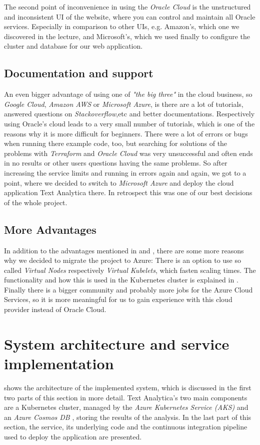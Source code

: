 \documentclass[conference]{IEEEtran}
\begin{document}
The second point of inconvenience in using the \textit{Oracle Cloud} is the unstructured and inconsistent UI of the website, where you can control and maintain all Oracle services. Especially in comparison to other UIs, e.g. Amazon's, which one we discovered in the lecture, and Microsoft's, which we used finally to configure the cluster and database for our web application.

\subsection{Documentation and support}
\label{subsec:docandsupport}
An even bigger advantage of using one of \textit{"the big three"} in the cloud business, so \textit{Google Cloud}, \textit{Amazon AWS} or \textit{Microsoft Azure}, is there are a lot of tutorials, answered questions on \textit{Stackoverflow},etc and better documentations. Respectively using Oracle's cloud leads to
a very small number of tutorials, which is one of the reasons why it is more difficult for beginners. There were a lot of errors or bugs when running there example code, too, but searching for solutions of the problems with \textit{Terraform} and \textit{Oracle Cloud} was very unsuccessful and often ends in no results or other users questions having the same problems.
So after increasing the service limits and running in errors again and again, we got to a point, where we decided to switch to \textit{Microsoft Azure} and deploy the cloud application Text Analytica there.
In retrospect this was one of our best decisions of the whole project.

\subsection{More Advantages}
In addition to the advantages mentioned in  and , there are some more reasons why we decided to migrate the project to Azure:
There is an option to use so called \textit{Virtual Nodes} respectively \textit{Virtual Kubelets}, which fasten scaling times. The functionality and how this is used in the Kubernetes cluster is explained in .
Finally there is a bigger community and probably more jobs for the Azure Cloud Services, so it is more meaningful for us to gain experience with this cloud provider instead of Oracle Cloud.

\section{System architecture and service implementation}
\label{sec:system-architecture}
 shows the architecture of the implemented system, which is discussed in the first two parts of this section in more detail. Text Analytica's two main components are a Kubernetes cluster, managed by the \textit{Azure Kubernetes Service (AKS)} \cite{AKS} and an \textit{Azure Cosmos DB} \cite{CosmosDB}, storing the results of the analysis. In the last part of this section, the service, its underlying code and the continuous integration pipeline used to deploy the application are presented.
\end{document}
